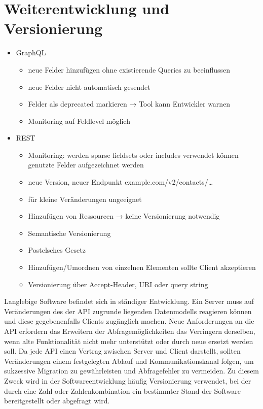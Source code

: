 \section{Weiterentwicklung und Versionierung}
\begin{itemize}
  \item GraphQL
  \begin{itemize}
    \item neue Felder hinzufügen ohne existierende Queries zu beeinflussen
    \item neue Felder nicht automatisch gesendet
    \item Felder als deprecated markieren → Tool kann Entwickler warnen
    \item Monitoring auf Feldlevel möglich
  \end{itemize}
  \item REST
  \begin{itemize}
    \item Monitoring: werden sparse fieldsets oder includes verwendet können genutzte Felder aufgezeichnet werden
    \item neue Version, neuer Endpunkt example.com/v2/contacts/\dots
    \item für kleine Veränderungen ungeeignet
    \item Hinzufügen von Ressourcen → keine Versionierung notwendig
    \item Semantische Versionierung
    \item Postelsches Gesetz
    \item Hinzufügen/Umordnen von einzelnen Elementen sollte Client akzeptieren
    \item Versionierung über Accept-Header, URI oder query string
  \end{itemize}
\end{itemize}
\par 
Langlebige Software befindet sich in ständiger Entwicklung.
Ein Server muss auf Veränderungen des der API zugrunde liegenden Datenmodells reagieren können und diese gegebenenfalls Clients zugänglich machen.
Neue Anforderungen an die API erfordern das Erweitern der Abfragemöglichkeiten das Verringern derselben, wenn alte Funktionalität nicht mehr unterstützt oder durch neue ersetzt werden soll.
Da jede API einen Vertrag zwischen Server und Client darstellt, sollten Veränderungen einem festgelegten Ablauf und Kommunikationskanal folgen, um sukzessive Migration zu gewährleisten und Abfragefehler zu vermeiden.
Zu diesem Zweck wird in der Softwareentwicklung häufig Versionierung verwendet, bei der durch eine Zahl oder Zahlenkombination ein bestimmter Stand der Software bereitgestellt oder abgefragt wird.
